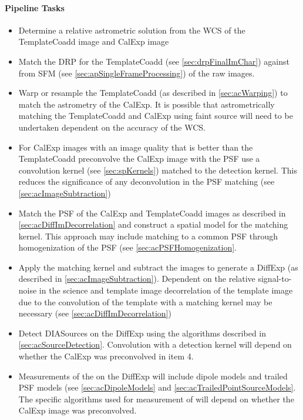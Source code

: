 \paragraph{Pipeline Tasks}

\begin{itemize}
\item Determine a relative astrometric solution from the WCS of the TemplateCoadd image and CalExp image
\item Match the DRP \Sources for the TemplateCoadd (see \ref{sec:drpFinalImChar}) against \Sources from SFM (see \ref{sec:apSingleFrameProcessing}) of the raw images.
\item Warp or resample the TemplateCoadd (as described in \ref{sec:acWarping}) to match the astrometry of the CalExp. It is possible that astrometrically matching the TemplateCoadd and CalExp using faint source will need to be undertaken dependent on the accuracy of the WCS.
\item For CalExp images with an image quality that is better than the TemplateCoadd preconvolve the CalExp image with the PSF use a  convolution kernel (see \ref{sec:spKernels}) matched to the detection kernel. This reduces the significance of any deconvolution in the PSF matching (see \ref{sec:acImageSubtraction})
\item Match the PSF of the CalExp and TemplateCoadd images as described in \ref{sec:acDiffImDecorrelation} and construct a spatial model for the matching kernel. This approach may include matching to a common PSF through homogenization of the PSF (see \ref{sec:acPSFHomogenization}.
\item Apply the matching kernel and subtract the images to generate a DiffExp (as described in \ref{sec:acImageSubtraction}). Dependent on the relative signal-to-noise in the science and template image decorrelation of the template image due to the convolution of the template with a matching kernel may be necessary (see \ref{sec:acDiffImDecorrelation})
\item Detect DIASources on the DiffExp using the algorithms described in \ref{sec:acSourceDetection}. Convolution with a detection kernel will depend on whether the CalExp was preconvolved in item 4. 
\item Measurements of the \DIASources on the DiffExp will include dipole models and trailed PSF models (see  \ref{sec:acDipoleModels} and \ref{sec:acTrailedPointSourceModels}. The specific algorithms used for measurement of \DIASources will depend on whether the CalExp image was preconvolved.  

\end{itemize}
